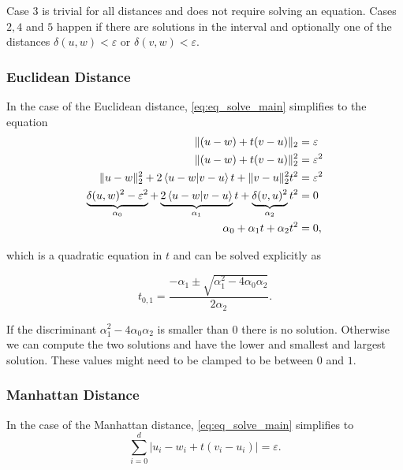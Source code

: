 Case \(3\) is trivial for all distances and does not require solving an equation. Cases \(2, 4\) and \(5\) happen if there are solutions in the interval and optionally one of the distances \(\delta(u,w) < \varepsilon\) or \(\delta(v,w) < \varepsilon\).


\subsubsection{Euclidean Distance}
\label{subsubsec:eq_euclidean_distance}
In the case of the Euclidean distance, \cref{eq:eq_solve_main} simplifies to the equation 
\begin{align*}
  \| (u - w) + t(v - u) \|_2 &= \varepsilon \\
  \| (u - w) + t(v - u) \|_2^2 &= \varepsilon^2 \\
  \| u - w \|_2^2 + 2\braket{u - w | v - u} t  +  \| v - u \|_2^2 t^2 &= \varepsilon^2 \\
  \underbrace{\delta(u,w)^2 - \varepsilon^2}_{\alpha_0} + \underbrace{2\braket{u - w | v - u} }_{\alpha_1}t  +  \underbrace{\delta(v, u)^2}_{\alpha_2} t^2 &= 0 \\
  \alpha_0 + \alpha_1 t  + \alpha_2 t^2 &= 0,
\end{align*}

which is a quadratic equation in \(t\) and can be solved explicitly as 

\begin{equation}
  t_{0,1} = \frac{-\alpha_1 \pm \sqrt{\alpha_1^2 - 4\alpha_0\alpha_2}}{2\alpha_2}.\label{eq:sol_explicit_euclidean}
\end{equation}

If the discriminant \(\alpha_1^2 - 4\alpha_0\alpha_2\) is smaller than \(0\) there is no solution. Otherwise we can compute the two solutions and have the lower and smallest and largest solution. These values might need to be clamped to be between \(0\) and \(1\). 


\subsubsection{Manhattan Distance}
\label{subsubsec:eq_manhattan_distance}
In the case of the Manhattan distance, \cref{eq:eq_solve_main} simplifies to 
\begin{equation}
  \sum_{i=0}^d |u_i - w_i + t (v_i - u_i)| = \varepsilon. \label{eq:solve_manhattan}
\end{equation}

